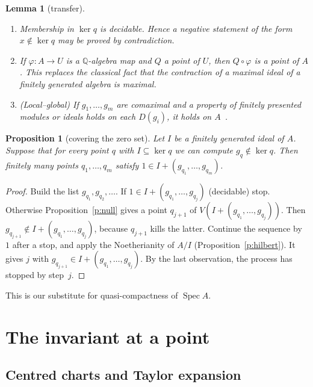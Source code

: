 \documentclass[11pt]{article}
\newcommand{\Q}{\mathbb{Q}}
\numberwithin{equation}{section}
\theoremstyle{plain}
\newtheorem{proposition}[theorem]{Proposition}
\newtheorem{lemma}[theorem]{Lemma}
\theoremstyle{definition}
\theoremstyle{remark}
\begin{document}
\begin{lemma}[transfer]\label{l:transfer}
\begin{enumerate}
\item Membership in $\ker q$ is decidable. Hence a negative statement of the form $x\notin\ker q$
  may be proved by contradiction.
\item If $\varphi:A\to U$ is a $\Q$-algebra map and $Q$ a point of $U$, then $Q\circ\varphi$ is a
  point of $A$. This replaces the classical fact that the contraction of a maximal ideal of a
  finitely generated algebra is maximal.
\item (Local--global) If $g_1,\dots,g_m$ are comaximal and a property of finitely presented modules
  or ideals holds on each $D(g_i)$, it holds on $A$~\cite[II]{LQ}.
\end{enumerate}
\end{lemma}

\begin{proposition}[covering the zero set]\label{p:cover}
Let $I$ be a finitely generated ideal of $A$. Suppose that for every point $q$ with
$I\subseteq\ker q$ we can compute $g_q\notin\ker q$. Then finitely many points $q_1,\dots,q_m$
satisfy $1\in I+(g_{q_1},\dots,g_{q_m})$.
\end{proposition}

\begin{proof}
Build the list $g_{q_1},g_{q_2},\dots$. If $1\in I+(g_{q_1},\dots,g_{q_j})$ (decidable) stop.
Otherwise Proposition~\ref{p:null} gives a point $q_{j+1}$ of $V(I+(g_{q_1},\dots,g_{q_j}))$. Then
$g_{q_{j+1}}\notin I+(g_{q_1},\dots,g_{q_j})$, because $q_{j+1}$ kills the latter. Continue the sequence by $1$
after a stop, and apply the Noetherianity of $A/I$ (Proposition~\ref{p:hilbert}). It gives $j$ with
$g_{q_{j+1}}\in I+(g_{q_1},\dots,g_{q_j})$. By the last observation, the process has stopped by
step~$j$.
\end{proof}

This is our substitute for quasi-compactness of $\operatorname{Spec}A$.

\section{The invariant at a point}\label{s:inv}

\subsection{Centred charts and Taylor expansion}
\end{document}
